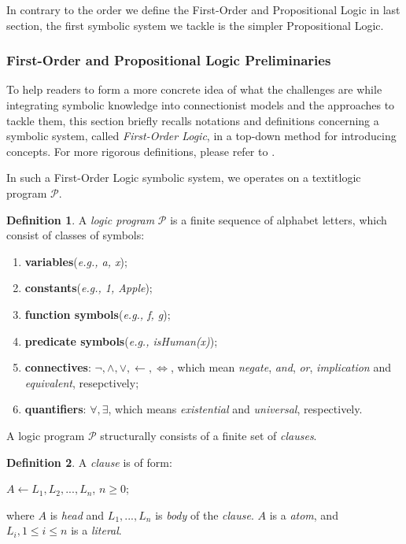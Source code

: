 \documentclass[letterpaper,10pt]{article}
\theoremstyle{definition}
\newtheorem{defn}{Definition}
\begin{document}
In contrary to the order we define the First-Order and Propositional Logic in last section, the first symbolic system we tackle is the simpler Propositional Logic. 

\subsubsection{First-Order and Propositional Logic Preliminaries}\label{fol_def_sec}

To help readers to form a more concrete idea of what the challenges are while
integrating symbolic knowledge into connectionist models and the approaches to
tackle them, this section briefly recalls notations and definitions concerning a symbolic system, called \emph{First-Order Logic}, in a top-down method for introducing concepts. For more rigorous definitions, please refer to \cite{lloyd2012foundations}.

In such a First-Order Logic symbolic system, we operates on a textit{logic program } $\mathcal{P}$.

\begin{defn}
A \textit{logic program} $\mathcal{P}$ is a finite sequence of alphabet letters, which consist of classes of symbols:
\begin{enumerate}[label=(\alph*), noitemsep]
\item \textbf{variables}(\textit{e.g., a, x}); 
\item \textbf{constants}(\textit{e.g., 1, Apple});
\item \textbf{function symbols}(\textit{e.g., f, g});
\item \textbf{predicate symbols}(\textit{e.g., isHuman(x)});
\item \textbf{connectives}: $\neg, \wedge, \vee, \leftarrow, \Leftrightarrow$, which mean \emph{negate}, \emph{and}, \emph{or}, \emph{implication} and \emph{equivalent}, resepctively;
\item \textbf{quantifiers}: $\forall, \exists$, which means \emph{existential} and \emph{universal}, respectively.
\end{enumerate}
\end{defn}

A logic program $\mathcal{P}$ structurally consists of a finite set of \textit{clauses}.

\begin{defn}
A \textit{clause} is of form:
\begin{center}	
$A \leftarrow L_1, L_2, ..., L_n$, $n \ge 0$;\\
\end{center}
\noindent
where $A$ is \emph{head} and $L_1, ... ,L_n$ is \emph{body} of the \emph{clause}. $A$ is a \textit{atom}, and $L_i, 1 \le i \le n$ is a \textit{literal}.
\end{defn}
\end{document}
